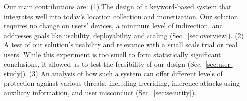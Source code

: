 Our main contributions are:
(1) The design of a keyword-based system that integrates well into today's location collection and monetization. Our solution requires no change on users' devices, a minimum level of indirection, and addresses goals like usability, deployability and
scaling (Sec.~\ref{sec:overview}).
(2) A test of our solution's usability and relevance with a small scale trial on real users. While this experiment is too small to form statistically significant conclusions, it allowed us to test the feasibility of our design (Sec.~\ref{sec:user-study}).
(3) An analysis of how such a system can offer different levels of protection against various threats, including freeriding, 
inference attacks using auxiliary information, and user misconduct (Sec.~\ref{sec:security}).


